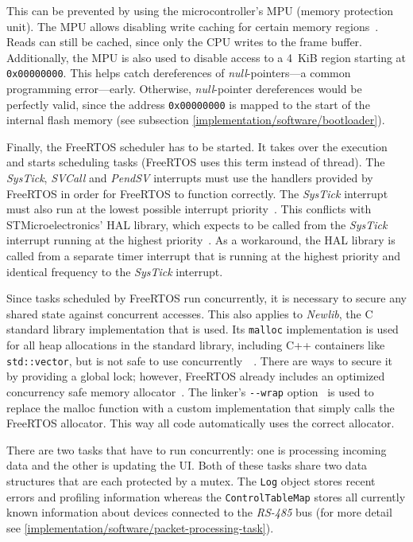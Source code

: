 This can be prevented by using the microcontroller's MPU (memory protection unit). The MPU allows
disabling write caching for certain memory regions~\cite{mcu-ref-manual}. Reads can still be cached,
since only the CPU writes to the frame buffer. Additionally, the MPU is also used to disable access
to a \SI{4}{KiB} region starting at \lstinline{0x00000000}. This helps catch dereferences of 
\textit{null}-pointers---a common programming error---early. Otherwise, \textit{null}-pointer
dereferences would be perfectly valid, since the address \lstinline{0x00000000} is mapped to the
start of the internal flash memory (see subsection \ref{implementation/software/bootloader}).

Finally, the FreeRTOS scheduler has to be started. It takes over the execution and starts scheduling
tasks (FreeRTOS uses this term instead of thread). The \textit{SysTick}, \textit{SVCall} and
\textit{PendSV} interrupts must use the handlers provided by FreeRTOS in order for FreeRTOS to
function correctly. The \textit{SysTick} interrupt must also run at the lowest possible interrupt
priority~\cite{freertos-arm-cortex-m}. This conflicts with STMicroelectronics' HAL library, which
expects to be called from the \textit{SysTick} interrupt running at the highest priority~\cite{stm32-hal-docs}.
As a workaround, the HAL library is called from a separate timer interrupt that is running at the
highest priority and identical frequency to the \textit{SysTick} interrupt.

Since tasks scheduled by FreeRTOS run concurrently, it is necessary to secure any shared state against
concurrent accesses. This also applies to \textit{Newlib}, the C standard library implementation
that is used. Its \lstinline{malloc} implementation is used for all heap allocations in the standard
library, including C++ containers like \mbox{\lstinline{std::vector},} but is not safe to use concurrently~\
\cite{newlib-malloc-lock}. There are ways to secure it by providing a global lock; however, FreeRTOS
already includes an optimized concurrency safe memory allocator~\cite{freertos-allocators}. The linker's
\lstinline{--wrap} option~\cite{arm-none-eabi-ld-manpage} is used to replace the malloc function with
a custom implementation that simply calls the FreeRTOS allocator. This way all code automatically
uses the correct allocator.

There are two tasks that have to run concurrently: one is processing incoming data and the other is
updating the UI. Both of these tasks share two data structures that are each protected by a mutex.
The \lstinline{Log} object stores recent errors and profiling information whereas the
\lstinline{ControlTableMap} stores all currently known information about devices connected to the
\textit{RS-485} bus (for more detail see \ref{implementation/software/packet-processing-task}).

